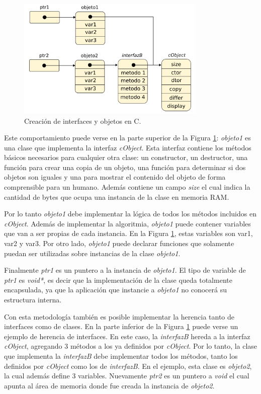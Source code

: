 \begin{figure}[h]
	\centering
	\includegraphics[width=9cm]{./Figures/3_2_3_c_orientado_objetos.png}
	\caption{Creación de interfaces y objetos en C.}
	\label{fig:firmware_diagrama_interfaces}
\end{figure}

Este comportamiento puede verse en la parte superior de la Figura \ref{fig:firmware_diagrama_interfaces}: \textit{objeto1} es una clase que implementa la  interfaz \textit{cObject}. Esta interfaz contiene los métodos básicos necesarios para cualquier otra clase: un constructor, un destructor, una función para crear una copia de un objeto, una función para determinar si dos objetos son iguales y una para mostrar el contenido del objeto de forma comprensible para un humano. Además contiene un campo \textit{size} el cual indica la cantidad de bytes que ocupa una instancia de la clase en memoria RAM.

Por lo tanto \textit{objeto1} debe implementar la lógica de todos los métodos incluidos en \textit{cObject}. Además de implementar la algoritmia, \textit{objeto1} puede contener variables que van a ser propias de cada instancia. En la Figura \ref{fig:firmware_diagrama_interfaces}, estas variables son var1, var2 y var3. Por otro lado, \textit{objeto1} puede declarar funciones que solamente puedan ser utilizadas sobre instancias de la clase \textit{objeto1}.

Finalmente \textit{ptr1} es un puntero a la instancia de \textit{objeto1}. El tipo de variable de \textit{ptr1} es \textit{void*}, es decir que la implementación de la clase queda totalmente encapsulada, ya que la aplicación que instancie a \textit{objeto1} no conocerá su estructura interna.

Con esta metodología también es posible implementar la herencia tanto de interfaces como de clases. En la parte inferior de la Figura \ref{fig:firmware_diagrama_interfaces} puede verse un ejemplo de herencia de interfaces. En este caso, la \textit{interfazB} hereda a la interfaz \textit{cObject}, agregando 3 métodos a los ya definidos por \textit{cObject}. Por lo tanto, la clase que implementa la \textit{interfazB} debe implementar todos los métodos, tanto los definidos por \textit{cObject} como los de \textit{interfazB}. En el ejemplo, esta clase es \textit{objeto2}, la cual además define 3 variables. Nuevamente \textit{ptr2} es un puntero a \textit{void} el cual apunta al área de memoria donde fue creada la instancia de \textit{objeto2}.

